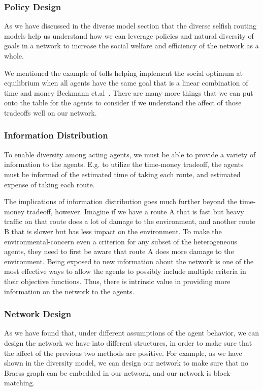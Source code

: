 \subsubsection{Policy Design}
As we have discussed in the diverse model section that the diverse selfish routing models help us understand how we can leverage policies and natural diversity of goals in a network to increase the social welfare and efficiency of the network as a whole. 

We mentioned the example of tolls helping implement the social optimum at equilibrium when all agents have the same goal that is a linear combination of time and money Beckmann et.al~\cite{beckmann1956studies}. There are many more things that we can put onto the table for the agents to consider if we understand the affect of those tradeoffs well on our network.


\subsubsection{Information Distribution}

To enable diversity among acting agents, we must be able to provide a variety of information to the agents. E.g. to utilize the time-money tradeoff, the agents must be informed of the estimated time of taking each route, and estimated expense of taking each route. 

The implications of information distribution goes much further beyond the time-money tradeoff, however. Imagine if we have a route A that is fast but heavy traffic on that route does a lot of damage to the environment, and another route B that is slower but has less impact on the environment. To make the environmental-concern even a criterion for any subset of the heterogeneous agents, they need to first be aware that route A does more damage to the environment. Being exposed to new information about the network is one of the most effective ways to allow the agents to possibly include multiple criteria in their objective functions. Thus, there is intrinsic value in providing more information on the network to the agents.

\subsubsection{Network Design}

As we have found that, under different assumptions of the agent behavior, we can design the network we have into different structures, in order to make sure that the affect of the previous two methods are positive. For example, as we have shown in the diversity model, we can design our network to make sure that no Braess graph can be embedded in our network, and our network is block-matching.

